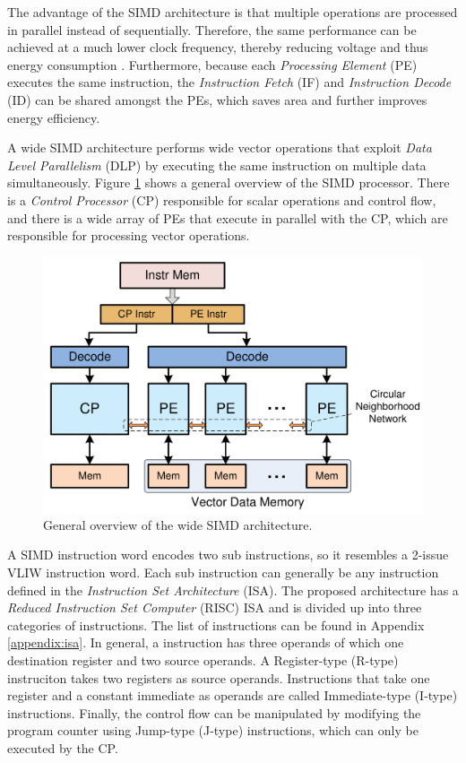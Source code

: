 
The advantage of the SIMD architecture is that multiple operations are processed in parallel instead of sequentially. Therefore, the same performance can be achieved at a much lower clock frequency, thereby reducing voltage and thus energy consumption \cite{dongrio1}. Furthermore, because each \emph{Processing Element} (PE) executes the same instruction, the \emph{Instruction Fetch} (IF) and \emph{Instruction Decode} (ID) can be shared amongst the PEs, which saves area and further improves energy efficiency.

A wide SIMD architecture \cite{simd} performs wide vector operations that exploit \emph{Data Level Parallelism} (DLP) by executing the same instruction on multiple data simultaneously. Figure \ref{fig:simd_overview} shows a general overview of the SIMD processor.
There is a \emph{Control Processor} (CP) responsible for scalar operations and control flow, and there is a wide array of PEs that execute in parallel with the CP, which are responsible for processing vector operations.

\begin{figure}[H]
\centering
\includegraphics[width=.6\textwidth]{figures/simd_overview}
\caption{General overview of the wide SIMD architecture.}
\label{fig:simd_overview}
\end{figure}
A SIMD instruction word encodes two sub instructions, so it resembles a 2-issue VLIW instruction word. Each sub instruction can generally be any instruction defined in the \emph{Instruction Set Architecture} (ISA). The proposed architecture has a \emph{Reduced Instruction Set Computer} (RISC) ISA and is divided up into three categories of instructions. The list of instructions can be found in Appendix \ref{appendix:isa}. In general, a instruction has three operands of which one destination register and two source operands. A Register-type (R-type) instruciton takes two registers as source operands. Instructions that take one register and a constant immediate as operands are called Immediate-type (I-type) instructions. Finally, the control flow can be manipulated by modifying the program counter using Jump-type (J-type) instructions, which can only be executed by the CP.
\\

